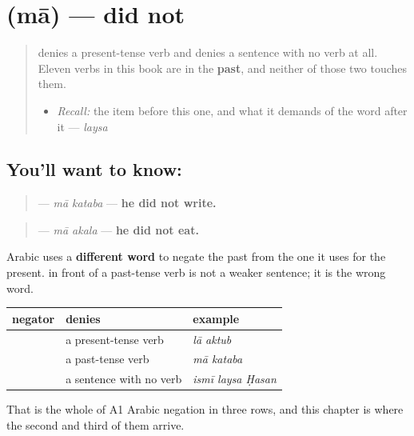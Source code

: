 \section[\texorpdfstring{\ar{ما} (mā)}{ما (mā)}]{ (mā) — did not}

\label{lesson:AR-C39-ma}



\begin{quote}
\textbf{} denies a present-tense verb and \textbf{} denies a sentence with no verb at all. Eleven verbs in this book are in the \textbf{past}, and neither of those two touches them.

\begin{itemize}
\raggedright
  \item \emph{Recall:} the item before this one, and what it demands of the word after it — \emph{laysa}
\end{itemize}
\end{quote}

\subsection*{You'll want to know: }
\begin{quote}
\textbf{ } — \emph{mā kataba} — \textbf{he did not write.}
\end{quote}

\begin{quote}
\textbf{ } — \emph{mā akala} — \textbf{he did not eat.}
\end{quote}

Arabic uses a \textbf{different word} to negate the past from the one it uses for the present. \textbf{} in front of a past-tense verb is not a weaker sentence; it is the wrong word.

\begin{grammarlens}[title={Grammar Lens: three negators, three kinds of sentence}]
\noindent
\begin{tabularx}{\linewidth}{@{}>{\raggedright\arraybackslash}X>{\raggedright\arraybackslash}X>{\raggedright\arraybackslash}X@{}}
\toprule
\textbf{negator} & \textbf{denies} & \textbf{example} \\
\midrule
\textbf{\ar{لا}} & a present-tense verb & \emph{lā aktub} \\
\textbf{\ar{ما}} & a past-tense verb & \emph{mā kataba} \\
\textbf{\ar{ليس}} & a sentence with no verb & \emph{ismī laysa Ḥasan} \\
\bottomrule
\end{tabularx}

That is the whole of A1 Arabic negation in three rows, and this chapter is where the second and third of them arrive.
\end{grammarlens}


